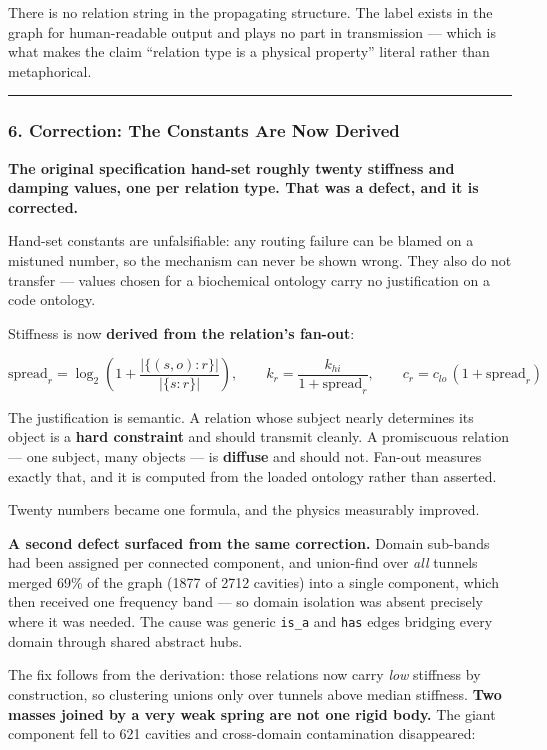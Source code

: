 \documentclass[
  11pt,
  a4paper,
]{article}
\begin{document}
There is no relation string in the propagating structure. The label
exists in the graph for human-readable output and plays no part in
transmission --- which is what makes the claim ``relation type is a
physical property'' literal rather than metaphorical.

\begin{center}\rule{0.5\linewidth}{0.5pt}\end{center}

\subsubsection{6. Correction: The Constants Are Now
Derived}\label{correction-the-constants-are-now-derived}

\textbf{The original specification hand-set roughly twenty stiffness and
damping values, one per relation type. That was a defect, and it is
corrected.}

Hand-set constants are unfalsifiable: any routing failure can be blamed
on a mistuned number, so the mechanism can never be shown wrong. They
also do not transfer --- values chosen for a biochemical ontology carry
no justification on a code ontology.

Stiffness is now \textbf{derived from the relation's fan-out}:

\[
\text{spread}_r = \log_2\!\left(1 + \frac{|\{(s,o) : r\}|}{|\{s : r\}|}\right),
\qquad
k_r = \frac{k_{hi}}{1 + \text{spread}_r},
\qquad
c_r = c_{lo}\,(1 + \text{spread}_r)
\]

The justification is semantic. A relation whose subject nearly
determines its object is a \textbf{hard constraint} and should transmit
cleanly. A promiscuous relation --- one subject, many objects --- is
\textbf{diffuse} and should not. Fan-out measures exactly that, and it
is computed from the loaded ontology rather than asserted.

Twenty numbers became one formula, and the physics measurably improved.

\textbf{A second defect surfaced from the same correction.} Domain
sub-bands had been assigned per connected component, and union-find over
\emph{all} tunnels merged 69\% of the graph (1877 of 2712 cavities) into
a single component, which then received one frequency band --- so domain
isolation was absent precisely where it was needed. The cause was
generic \texttt{is\_a} and \texttt{has} edges bridging every domain
through shared abstract hubs.

The fix follows from the derivation: those relations now carry
\emph{low} stiffness by construction, so clustering unions only over
tunnels above median stiffness. \textbf{Two masses joined by a very weak
spring are not one rigid body.} The giant component fell to 621 cavities
and cross-domain contamination disappeared:
\end{document}
